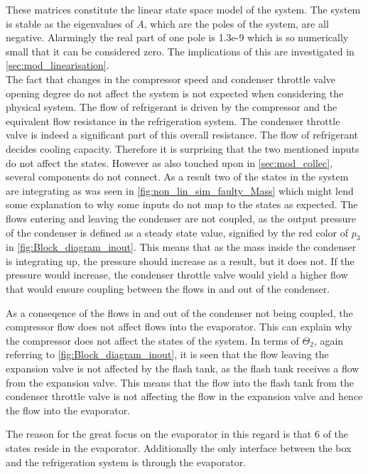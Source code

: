 These matrices constitute the linear state space model of the system. The system is stable as the eigenvalues of $A$, which are the poles of the system, are all negative. Alarmingly the real part of one pole is 1.3e-9 which is so numerically small that it can be considered zero. The implications of this are investigated in \cref{sec:mod_linearisation}.  \\

The fact that changes in the compressor speed and condenser throttle valve opening degree do not affect the system is not expected when considering the physical system. The flow of refrigerant is driven by the compressor and the equivalent flow resistance in the refrigeration system. The condenser throttle valve is indeed a significant part of this overall resistance. The flow of refrigerant decides cooling capacity. Therefore it is surprising that the two mentioned inputs do not affect the states. However as also touched upon in \cref{sec:mod_collec}, several components do not connect. As a result two of the states in the system are integrating as was seen in \cref{fig:non_lin_sim_faulty_Mass} which might lend some explanation to why some inputs do not map to the states as expected. The flows entering and leaving the condenser are not coupled, as the output pressure of the condenser is defined as a steady state value, signified by the red color of $ p_3 $ in \cref{fig:Block_diagram_inout}. This means that as the mass inside the condenser is integrating up, the pressure should increase as a result, but it does not. If the pressure would increase, the condenser throttle valve would yield a higher flow that would ensure coupling between the flows in and out of the condenser.

As a conseqence of the flows in and out of the condenser not being coupled, the compressor flow does not affect flows into the evaporator. This can explain why the compressor does not affect the states of the system.
In terms of $ \Theta_2 $, again referring to \cref{fig:Block_diagram_inout}, it is seen that the flow leaving the expansion valve is not affected by the flash tank, as the flash tank receives a flow from the expansion valve. This means that the flow into the flash tank from the condenser throttle valve is not affecting the flow in the expansion valve and hence the flow into the evaporator.

The reason for the great focus on the evaporator in this regard is that 6 of the states reside in the evaporator. Additionally the only interface between the box and the refrigeration system is through the evaporator.

